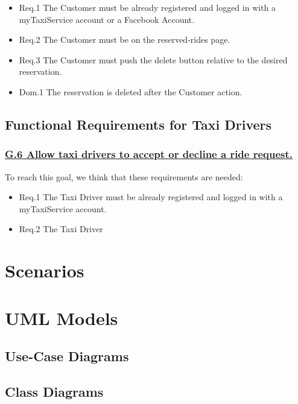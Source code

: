 \documentclass{report}
\begin{document}
				\begin{itemize}
					\item \lbrack Req.1\rbrack \label{sec:fr1_g5} The Customer must be already registered and logged in with a myTaxiService account or a Facebook Account.
					\item \lbrack Req.2\rbrack \label{sec:fr2_g5} The Customer must be on the reserved-rides page.
					\item \lbrack Req.3\rbrack \label{sec:fr3_g5} The Customer must push the delete button relative to the desired reservation.
					\item \lbrack Dom.1\rbrack \label{sec:da1_g5} The reservation is deleted after the Customer action.
				\end{itemize}

		\subsection{Functional Requirements for Taxi Drivers}

			\subsubsection{\lbrack \hyperref[sec:g6]{G.6 Allow taxi drivers to accept or decline a ride request.}\rbrack}
			To reach this goal, we think that these requirements are needed:

				\begin{itemize}
					\item \lbrack Req.1\rbrack \label{sec:fr1_g6} The Taxi Driver must be already registered and logged in with a myTaxiService account.
					\item \lbrack Req.2\rbrack \label{sec:fr2_g6} The Taxi Driver 
				\end{itemize}


	\section{Scenarios}


	\section{UML Models}

		\subsection{Use-Case Diagrams}

		\subsection{Class Diagrams}
\end{document}
